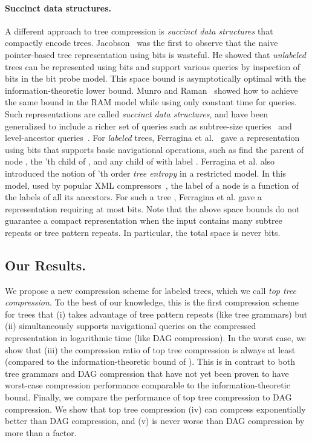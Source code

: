 \documentclass [11pt]{article}
\begin{document}
\paragraph{Succinct  data structures.} A different approach to tree compression is \emph{succinct data structures} that compactly encode trees. Jacobson~\cite{Jacobson} was the first to observe that the naive pointer-based tree representation using  bits is wasteful. He showed that {\em unlabeled} trees can be represented using  bits and support various queries by inspection of  bits in the bit probe model. This space bound is asymptotically optimal with the information-theoretic lower bound. Munro and Raman~\cite{MunroRaman01} showed how to achieve the same bound in the RAM model while using only constant time for queries. Such representations are called \emph{succinct data structures}, and have  been generalized to include a richer set of queries such as subtree-size queries~\cite{MunroRaman01,BenoitEtAl05} and level-ancestor queries~\cite{Geary04succinctordinal}.
For {\em labeled} trees, Ferragina et al.~\cite{FerraginaFOCS2005} gave a representation using  bits that
supports basic navigational operations, such as find the parent of node , the 'th child of , and any child of  with label . Ferragina et al. also introduced the notion of 'th order {\em tree entropy}  in a restricted model. In this model, used by popular  XML compressors~\cite{XML2,XML1}, the label of a node is a function of the labels of all its ancestors. For such a tree ,  Ferragina et al. gave a representation requiring at most  bits. Note that  the above space bounds do not guarantee a  compact representation when the input contains many subtree repeats or tree pattern repeats. In particular, the total space is never  bits.



\subsection{Our Results.}
We propose a new compression scheme for labeled trees, which we call \emph{top tree compression}. To the best of our knowledge, this is the first compression scheme for trees that (i) takes advantage of tree pattern repeats (like tree grammars) but (ii) simultaneously supports navigational queries on the compressed representation in logarithmic time (like DAG compression). 
In the worst case, we show  that (iii) the compression ratio of top tree compression is always at least  (compared to the information-theoretic bound of ). This is in contrast to both tree grammars and DAG compression that have not yet been proven to have worst-case compression performance comparable to the information-theoretic bound. Finally, we compare the performance of top tree compression to DAG compression. We show that top tree compression (iv) can compress exponentially better than DAG compression, and (v) is never  worse than DAG compression by more than a   factor. 
\end{document}
